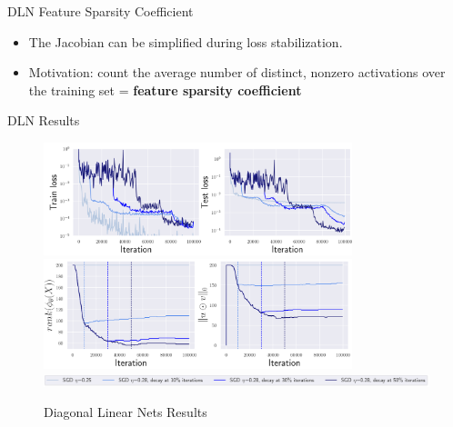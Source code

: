 \documentclass[fleqn]{beamer}
\begin{document}
    \begin{frame}{DLN Feature Sparsity Coefficient}
        \begin{itemize}[<+->]
            \item The Jacobian can be simplified during loss stabilization.
            \item Motivation: count the average number of distinct, nonzero
                activations over the training set = \textbf{feature sparsity
                coefficient}
        \end{itemize}
    \end{frame}

    \begin{frame}{DLN Results}
        \begin{figure}[htpb]
            \centering
            \includegraphics[width=0.8\textwidth,
            height=0.4\textheight]{./pics/dn_loss.png}
            \includegraphics[width=0.8\textwidth,
            height=0.4\textheight]{./pics/dn_sparsity.png}
            \includegraphics[width=\textwidth]{./pics/dn_setup.png}
            \caption{Diagonal Linear Nets Results}
        \end{figure}
    \end{frame}
\end{document}
